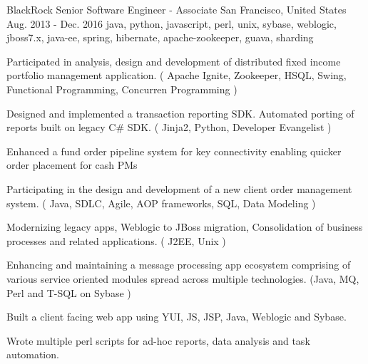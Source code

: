 \cventry
    {BlackRock} %
    {Senior Software Engineer - Associate} %
    {San Francisco, United States} %
    {Aug. 2013 - Dec. 2016} %
    {java, python, javascript, perl, unix, sybase, weblogic, jboss7.x, java-ee, spring, hibernate, apache-zookeeper, guava, sharding}%
    {
    \begin{cvitems} %
        \item { Participated in analysis, design and development of distributed fixed income portfolio management application. ( Apache Ignite, Zookeeper, HSQL, Swing, Functional Programming, Concurren Programming )}
        \item { Designed and implemented a transaction reporting SDK. Automated porting of reports built on legacy C\# SDK. ( Jinja2, Python, Developer Evangelist )}
        \item { Enhanced a fund order pipeline system for key connectivity enabling quicker order placement for cash PMs}
        \item { Participating in the design and development of a new client order management system. ( Java, SDLC, Agile, AOP frameworks, SQL, Data Modeling )}
        \item { Modernizing legacy apps, Weblogic to JBoss migration, Consolidation of business processes and related applications. ( J2EE, Unix )}
        \item { Enhancing and maintaining a message processing app ecosystem comprising of various service oriented modules spread across multiple technologies. (Java, MQ, Perl and T-SQL on Sybase )}
        \item { Built a client facing web app using YUI, JS, JSP, Java, Weblogic and Sybase.}
        \item { Wrote multiple perl scripts for ad-hoc reports, data analysis and task automation.}
    \end{cvitems}
    }